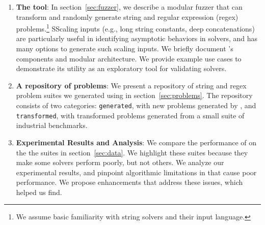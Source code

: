 \begin{enumerate}
    \item \textbf{The \fuzzer{} tool}:
        In section~\ref{sec:fuzzer}, we describe a modular fuzzer that can
        transform and randomly generate \smtfull{} string and regular
        expression (regex) problems.\footnote{We assume basic
        familiarity with string solvers and their input
        language.} SScaling inputs (e.g., long string constants,
        deep concatenations) are particularly useful in identifying asymptotic
        behaviors in solvers, and \fuzzer{} has many options to generate such
        scaling inputs. We briefly document \fuzzer{}'s
        components and modular architecture. We provide example use cases to
        demonstrate its utility as an exploratory tool for validating
        solvers.

    \item \textbf{A repository of \smtfull{} problems}:
        We present a repository of \smtfull{} string and regex problem suites
        we generated using \fuzzer{} in section~\ref{sec:problems}. The
        repository consists of two categories: \texttt{generated}, with new
        problems generated by \fuzzer{}, and \texttt{transformed}, with
        transformed problems generated from a small suite of industrial
        benchmarks.

    \item \textbf{Experimental Results and Analysis}:
        We compare the performance of \theSolvers{} on the
        the \fuzzer{} suites \theSuites{} in section~\ref{sec:data}. We
        highlight these suites because they make some solvers perform poorly,
        but not others. We analyze our
        experimental results, and pinpoint algorithmic limitations
        in \us{} that cause poor performance. We propose enhancements that
        address these issues, which \fuzzer{} helped us find.
\end{enumerate}
